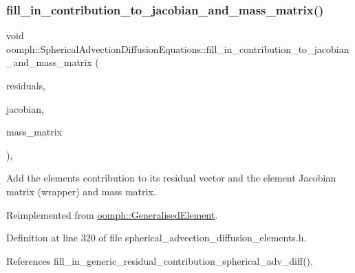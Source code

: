 \mbox{\label{classoomph_1_1SphericalAdvectionDiffusionEquations_a7aeb7cc67f60d713fd64321004229401}} 
\subsubsection{\texorpdfstring{fill\+\_\+in\+\_\+contribution\+\_\+to\+\_\+jacobian\+\_\+and\+\_\+mass\+\_\+matrix()}{fill\_in\_contribution\_to\_jacobian\_and\_mass\_matrix()}}
{\footnotesize\ttfamily void oomph\+::\+Spherical\+Advection\+Diffusion\+Equations\+::fill\+\_\+in\+\_\+contribution\+\_\+to\+\_\+jacobian\+\_\+and\+\_\+mass\+\_\+matrix (\begin{DoxyParamCaption}\item[{\hyperlink{classoomph_1_1Vector}{Vector}$<$ double $>$ \&}]{residuals,  }\item[{\hyperlink{classoomph_1_1DenseMatrix}{Dense\+Matrix}$<$ double $>$ \&}]{jacobian,  }\item[{\hyperlink{classoomph_1_1DenseMatrix}{Dense\+Matrix}$<$ double $>$ \&}]{mass\+\_\+matrix }\end{DoxyParamCaption})\hspace{0.3cm}{\ttfamily [inline]}, {\ttfamily [virtual]}}



Add the element\textquotesingle{}s contribution to its residual vector and the element Jacobian matrix (wrapper) and mass matrix. 



Reimplemented from \hyperlink{classoomph_1_1GeneralisedElement_a2b6294a730647cf865da94f2531466f8}{oomph\+::\+Generalised\+Element}.



Definition at line 320 of file spherical\+\_\+advection\+\_\+diffusion\+\_\+elements.\+h.



References fill\+\_\+in\+\_\+generic\+\_\+residual\+\_\+contribution\+\_\+spherical\+\_\+adv\+\_\+diff().

